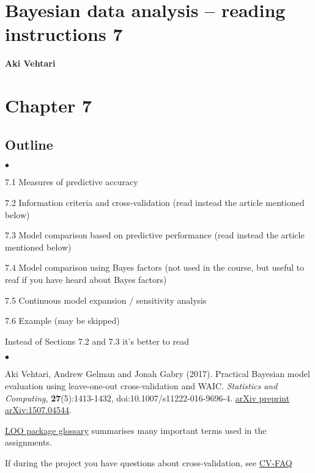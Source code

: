 \documentclass[a4paper,11pt,english]{article}
\begin{document}
\thispagestyle{empty}

\section*{Bayesian data analysis -- reading instructions 7} 
\smallskip
{\bf Aki Vehtari}

\smallskip

\section*{Chapter 7}

\subsection*{Outline}
\begin{list}{$\bullet$}{\parsep=0pt\itemsep=2pt}
\item 7.1 Measures of predictive accuracy
\item {\color{gray}7.2 Information criteria and cross-validation} (read instead the article mentioned below)
\item {\color{gray}7.3 Model comparison based on predictive performance}  (read instead the article mentioned below)
\item {\color{gray}7.4 Model comparison using Bayes factors (not used in the course, but useful to reaf if you have heard about Bayes factors)}
\item 7.5 Continuous model expansion / sensitivity analysis
\item {\color{gray}7.6 Example (may be skipped)}
\end{list}

\noindent
Instead of Sections 7.2 and 7.3 it's better to read
\begin{list}{$\bullet$}{\parsep=0pt\itemsep=2pt}
\item Aki Vehtari, Andrew Gelman and Jonah Gabry (2017). Practical
  Bayesian model evaluation using leave-one-out cross-validation and
  WAIC. \textit{Statistics and Computing}, \textbf{27}(5):1413-1432,
  doi:10.1007/s11222-016-9696-4. \href{http://arxiv.org/abs/1507.04544}{arXiv preprint arXiv:1507.04544}.
\item \href{https://mc-stan.org/loo/reference/loo-glossary.html}{LOO
    package glossary} summarises many important terms used in the
  assignments.
\item If during the project you have questions about cross-validation, see \href{https://avehtari.github.io/modelselection/CV-FAQ.html}{CV-FAQ}
\end{list}
\end{document}
